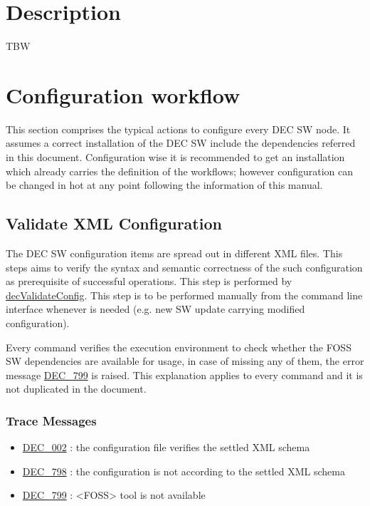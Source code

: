 \documentclass[dec_sum_main.tex]{subfiles}
\begin{document}
\section{Description}
TBW

\section{Configuration workflow}
This section comprises the typical actions to configure every DEC SW node. It assumes a correct installation of the DEC SW include the dependencies referred in this document. Configuration wise it is recommended to get an installation which already carries the definition of the workflows; however configuration can be changed in hot at any point following the information of this manual. 

\subsection{Validate XML Configuration}
The DEC SW configuration items are spread out in different XML files. This steps aims to verify the syntax and semantic correctness of the such configuration as prerequisite of successful operations. This step is performed by \hyperref[decValidateConfig]{decValidateConfig}. This step is to be performed manually from the command line interface whenever is needed (e.g. new SW update carrying modified configuration).\newline

\par \noindent
Every command verifies the execution environment to check whether the FOSS SW dependencies are available for usage, in case of missing any of them, the error message \hyperref[DEC799]{DEC\_799} is raised. This explanation applies to every command and it is not duplicated in the document.\newline


\subsubsection{Trace Messages}

\begin{itemize}
    \item \hyperref[DEC002]{DEC\_002} : the configuration file verifies the settled XML schema
	\item \hyperref[DEC798]{DEC\_798} : the configuration is not according to the settled XML schema
    \item \hyperref[DEC799]{DEC\_799} : <FOSS> tool is not available 
\end{itemize}
\end{document}

